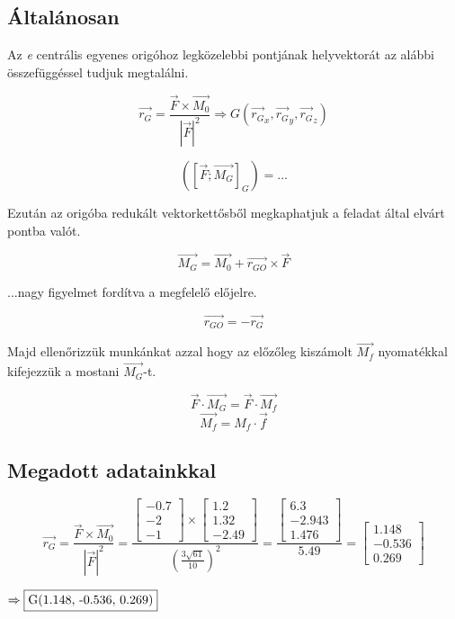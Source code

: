 
\subsection{Általánosan}

Az \textit{e} centrális egyenes origóhoz legközelebbi pontjának helyvektorát az alábbi összefüggéssel tudjuk megtalálni.

$$\vec{r_G} = \frac{\vec{F} \times \vec{M_0}}{|\vec{F}|^2} \Rightarrow G(\vec{r_G}_x, \vec{r_G}_y, \vec{r_G}_z)$$

$$([\vec{F}; \vec{M_G}]_G) = \ldots$$

Ezután az origóba redukált vektorkettősből megkaphatjuk a feladat által elvárt pontba valót.

$$\vec{M_G} = \vec{M_0} + \vec{r_{GO}} \times \vec{F}$$

...nagy figyelmet fordítva a megfelelő előjelre.

$$\vec{r_{GO}} = -\vec{r_G}$$

Majd ellenőrizzük munkánkat azzal hogy az előzőleg kiszámolt $\vec{M_f}$ nyomatékkal kifejezzük a mostani $\vec{M_G}$-t.

$$\vec{F} \cdot \vec{M_G} = \vec{F} \cdot \vec{M_f}$$
$$\vec{M_f} = M_f \cdot \vec{f}$$

\subsection{Megadott adatainkkal}

$$\vec{r_G} = \frac{
	\vec{F} \times \vec{M_0}
}{
|\vec{F}|^2} = \frac{
\begin{bmatrix} -0.7 \\ -2 \\ -1 \end{bmatrix} \times \begin{bmatrix} 1.2 \\ 1.32 \\ -2.49 \end{bmatrix}
}{(\frac{3\sqrt{61}}{10})^2} = \frac{\begin{bmatrix} 6.3 \\ -2.943 \\ 1.476 \end{bmatrix}}{5.49} = \begin{bmatrix} 1.148 \\ -0.536 \\ 0.269 \end{bmatrix}$$

\begin{center}
	$\Rightarrow \fbox{G(1.148, -0.536, 0.269)}$
\end{center}

